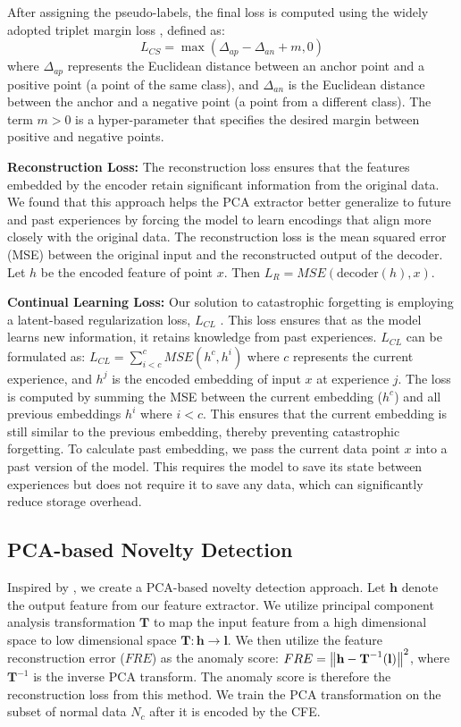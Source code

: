 After assigning the pseudo-labels, the final loss is computed using the widely adopted triplet margin loss \cite{schroff2015facenet}, defined as:
\begin{equation}
    L_{CS} = \max\left( \Delta_{ap} - \Delta_{an} + m, 0 \right)
\end{equation} where $\Delta_{ap}$ represents the Euclidean distance between an anchor point and a positive point (a point of the same class), and $\Delta_{an}$ is the Euclidean distance between the anchor and a negative point (a point from a different class). The term $m > 0$ is a hyper-parameter that specifies the desired margin between positive and negative points.

\textbf{Reconstruction Loss:} The reconstruction loss ensures that the features embedded by the encoder retain significant information from the original data. We found that this approach helps the PCA extractor better generalize to future and past experiences by forcing the model to learn encodings that align more closely with the original data. The reconstruction loss is the mean squared error (MSE) between the original input and the reconstructed output of the decoder. Let $h$ be the encoded feature of point $x$. Then $L_R = MSE(\text{decoder}(h) , x)$.

\textbf{Continual Learning Loss:} Our solution to catastrophic forgetting is employing a latent-based regularization loss, $L_{CL}$ \cite{ashfahani2023unsupervised}. This loss ensures that as the model learns new information, it retains knowledge from past experiences.  $L_{CL}$ can be formulated as: $
    L_{CL} = \sum_{i < c}^{c} MSE(h^{c}, h^{i}) $
where $c$ represents  the current experience, and \textbf{$h^{j}$}  is the encoded embedding of input $x$ at experience $j$. The loss is computed by summing the MSE between the current embedding (${h^c}$) and all previous embeddings $h^{i}$ where $i < c$. This ensures that the current embedding is still similar to the previous embedding, thereby preventing catastrophic forgetting. To calculate past embedding, we pass the current data point $x$ into a past version of the model. This requires the model to save its state between experiences but does not require it to save any data, which can significantly reduce storage overhead.
\subsection{PCA-based Novelty Detection}
Inspired by \cite{rios2022incdfm}, we create a PCA-based novelty detection approach. Let $\textbf{h}$ denote the output feature from our feature extractor. We utilize principal component analysis transformation $\textbf{T}$ to map the input feature from a high dimensional space to low dimensional space $\textbf{T} : \textbf{h} \rightarrow \textbf{l}$. We then utilize the feature reconstruction error ($FRE$) as the anomaly score: $FRE = \left\lVert\textbf{h} - \textbf{T}^{-1}(\textbf{l})\right\rVert ^2$, where $\textbf{T}^{-1}$ is the inverse PCA transform. The anomaly score is therefore the reconstruction loss from this method. We train the PCA transformation on the subset of normal data $N_c$ after it is encoded by the CFE.  